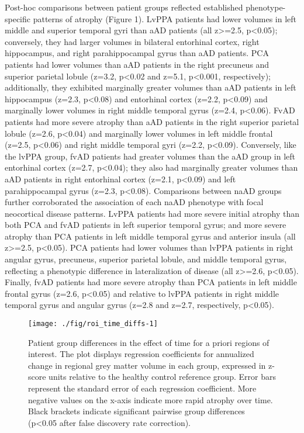 \documentclass[]{article}
\begin{document}
Post-hoc comparisons between patient groups reflected established
phenotype-specific patterns of atrophy (Figure 1). LvPPA patients had
lower volumes in left middle and superior temporal gyri than aAD
patients (all z\textgreater{}=2.5, p\textless{}0.05); conversely, they
had larger volumes in bilateral entorhinal cortex, right hippocampus,
and right parahippocampal gyrus than aAD patients. PCA patients had
lower volumes than aAD patients in the right precuneus and superior
parietal lobule (z=3.2, p\textless{}0.02 and z=5.1, p\textless{}0.001,
respectively); additionally, they exhibited marginally greater volumes
than aAD patients in left hippocampus (z=2.3, p\textless{}0.08) and
entorhinal cortex (z=2.2, p\textless{}0.09) and marginally lower volumes
in right middle temporal gyrus (z=2.4, p\textless{}0.06). FvAD patients
had more severe atrophy than aAD patients in the right superior parietal
lobule (z=2.6, p\textless{}0.04) and marginally lower volumes in left
middle frontal (z=2.5, p\textless{}0.06) and right middle temporal gyri
(z=2.2, p\textless{}0.09). Conversely, like the lvPPA group, fvAD
patients had greater volumes than the aAD group in left entorhinal
cortex (z=2.7, p\textless{}0.04); they also had marginally greater
volumes than aAD patients in right entorhinal cortex (z=2.1,
p\textless{}0.09) and left parahippocampal gyrus (z=2.3,
p\textless{}0.08). Comparisons between naAD groups further corroborated
the association of each naAD phenotype with focal neocortical disease
patterns. LvPPA patients had more severe initial atrophy than both PCA
and fvAD patients in left superior temporal gyrus; and more severe
atrophy than PCA patients in left middle temporal gyrus and anterior
insula (all z\textgreater{}=2.5, p\textless{}0.05). PCA patients had
lower volumes than lvPPA patients in right angular gyrus, precuneus,
superior parietal lobule, and middle temporal gyrus, reflecting a
phenotypic difference in lateralization of disease (all
z\textgreater{}=2.6, p\textless{}0.05). Finally, fvAD patients had more
severe atrophy than PCA patients in left middle frontal gyrus (z=2.6,
p\textless{}0.05) and relative to lvPPA patients in right middle
temporal gyrus and angular gyrus (z=2.8 and z=2.7, respectively,
p\textless{}0.05).

\begin{figure}

{\centering \texttt{[image: ./fig/roi\_time\_diffs-1]} 

}

\caption{Patient group differences in the effect of time for a priori regions of interest. The plot displays regression coefficients for annualized change in regional grey matter volume in each group, expressed in z-score units relative to the healthy control reference group. Error bars represent the standard error of each regression coefficient. More negative values on the x-axis indicate more rapid atrophy over time. Black brackets indicate significant pairwise group differences (p<0.05 after false discovery rate correction).}\label{fig:roi_time_diffs}
\end{figure}
\end{document}

